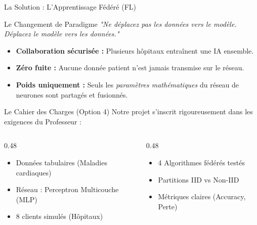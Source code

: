 \documentclass[aspectratio=169,11pt]{beamer}
\begin{document}
\begin{frame}{La Solution : L'Apprentissage F\'{e}d\'{e}r\'{e} (FL)}
  \begin{exampleblock}{Le Changement de Paradigme}
    \textit{"Ne d\'{e}placez pas les donn\'{e}es vers le mod\`{e}le. D\'{e}placez le mod\`{e}le vers les donn\'{e}es."}
  \end{exampleblock}
  \vspace{0.4cm}
  
  \begin{itemize}
    \item \textbf{Collaboration s\'{e}curis\'{e}e :} Plusieurs h\^{o}pitaux entra\^{i}nent une IA ensemble.
    \item \textbf{Z\'{e}ro fuite :} Aucune donn\'{e}e patient n'est jamais transmise sur le r\'{e}seau.
    \item \textbf{Poids uniquement :} Seuls les \emph{param\`{e}tres math\'{e}matiques} du r\'{e}seau de neurones sont partag\'{e}s et fusionn\'{e}s.
  \end{itemize}
\end{frame}

\begin{frame}{Le Cahier des Charges (Option 4)}
  Notre projet s'inscrit rigoureusement dans les exigences du Professeur :
  \vspace{0.3cm}
  \begin{columns}
    \begin{column}{0.48\textwidth}
      \begin{itemize}
          \item[\color{cyanAccent}\ding{51}] Donn\'{e}es tabulaires (Maladies cardiaques)
          \item[\color{cyanAccent}\ding{51}] R\'{e}seau : Perceptron Multicouche (MLP)
          \item[\color{cyanAccent}\ding{51}] 8 clients simul\'{e}s (H\^{o}pitaux)
      \end{itemize}
    \end{column}
    \begin{column}{0.48\textwidth}
      \begin{itemize}
          \item[\color{cyanAccent}\ding{51}] 4 Algorithmes f\'{e}d\'{e}r\'{e}s test\'{e}s
          \item[\color{cyanAccent}\ding{51}] Partitions IID vs Non-IID
          \item[\color{cyanAccent}\ding{51}] M\'{e}triques claires (Accuracy, Perte)
      \end{itemize}
    \end{column}
  \end{columns}
\end{frame}
\end{document}
